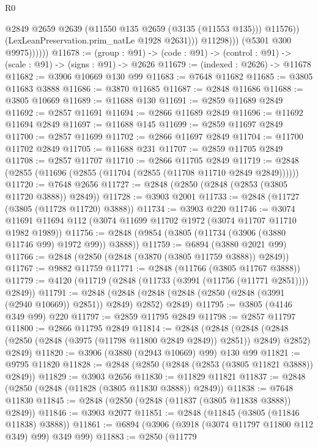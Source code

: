 \begin{lexlean}{R0}
\begin{coremodule}
                            @2849
                            @2659
                            @2639
                            (@11550 @135 @2659 (@3135 (@11553 @135)))
                            @11576))
                        (LexLeanPreservation.prim_natLe @1928 @2631)))
                    @11298)))
              (@5301 @300 @9975))))))
@11678 := (group : @91) ->
  (code : @91) -> (control : @91) -> (scale : @91) -> (signs : @91) -> @2626
@11679 := (indexed : @2626) -> @11678
@11682 := @3906 @10669 @130 @99
@11683 := @7648 @11682
@11685 := @3805 @11683 @3888
@11686 := @3870 @11685
@11687 := @2848 @11686
@11688 := @3805 @10669
@11689 := @11688 @130
@11691 := @2859 @11689 @2849
@11692 := @2857 @11691
@11694 := @2866 @11689 @2849
@11696 := @11692 @11694 @2849
@11697 := @11688 @145
@11699 := @2859 @11697 @2849
@11700 := @2857 @11699
@11702 := @2866 @11697 @2849
@11704 := @11700 @11702 @2849
@11705 := @11688 @231
@11707 := @2859 @11705 @2849
@11708 := @2857 @11707
@11710 := @2866 @11705 @2849
@11719 := @2848 (@2855 (@11696 (@2855 (@11704 (@2855 (@11708 @11710 @2849 @2849))))))
@11720 := @7648 @2656
@11727 := @2848 (@2850 (@2848 (@2853 (@3805 @11720 @3888)) @2849))
@11728 := @3903 @2001
@11733 := @2848 (@11727 (@3805 (@11728 @11720) @3888))
@11734 := @3903 @220
@11746 := @3074 @11691 @11694 @112 (@3074 @11699 @11702 @1972 (@3074 @11707 @11710 @1982 @1989))
@11756 := @2848 (@9854 (@3805 (@11734 (@3906 (@3880 @11746 @99) @1972 @99)) @3888))
@11759 := @6894 (@3880 @2021 @99)
@11766 := @2848 (@2850 (@2848 (@3870 (@3805 @11759 @3888)) @2849))
@11767 := @9882 @11759
@11771 := @2848 (@11766 (@3805 @11767 @3888))
@11779 := @4120 (@11719 (@2848 (@11733 (@3991 (@11756 (@11771 @2851)))) @2849))
@11791 := @2848
    (@2848 (@2848 (@2848 (@2850 (@2848 (@3991 (@2940 @10669)) @2851)) @2849) @2852) @2849)
@11795 := @3805 (@4146 @349 @99) @220
@11797 := @2859 @11795 @2849
@11798 := @2857 @11797
@11800 := @2866 @11795 @2849
@11814 := @2848
    (@2848
      (@2848 (@2848 (@2850 (@2848 (@3975 (@11798 @11800 @2849 @2849)) @2851)) @2849) @2852)
      @2849)
@11820 := @3906 (@3880 (@2943 @10669) @99) @130 @99
@11821 := @9795 @11820
@11828 := @2848 (@2850 (@2848 (@2853 (@3805 @11821 @3888)) @2849))
@11829 := @3903 @2656
@11830 := @11829 @11821
@11837 := @2848 (@2850 (@2848 (@11828 (@3805 @11830 @3888)) @2849))
@11838 := @7648 @11830
@11845 := @2848 (@2850 (@2848 (@11837 (@3805 @11838 @3888)) @2849))
@11846 := @3903 @2077
@11851 := @2848 (@11845 (@3805 (@11846 @11838) @3888))
@11861 := @6894 (@3906 (@3918 (@3074 @11797 @11800 @112 @349) @99) @349 @99)
@11883 := @2850
    (@11779

\end{coremodule}
\end{lexlean}
